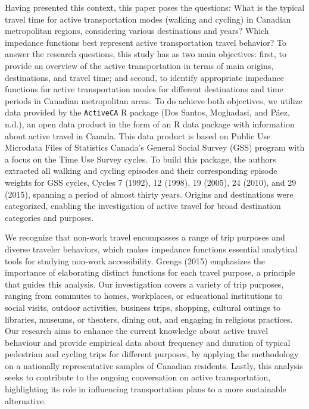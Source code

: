 \documentclass[preprint, 3p,
authoryear]{elsarticle} %
\begin{document}
Having presented this context, this paper poses the questions: What is
the typical travel time for active transportation modes (walking and
cycling) in Canadian metropolitan regions, considering various
destinations and years? Which impedance functions best represent active
transportation travel behavior? To answer the research questions, this
study has as two main objectives: first, to provide an overview of the
active transportation in terms of main origins, destinations, and travel
time; and second, to identify appropriate impedance functions for active
transportation modes for different destinations and time periods in
Canadian metropolitan areas. To do achieve both objectives, we utilize
data provided by the \texttt{ActiveCA} R package (Dos Santos, Moghadasi,
and Páez, n.d.), an open data product in the form of an R data package
with information about active travel in Canada. This data product is
based on Public Use Microdata Files of Statistics Canada's General
Social Survey (GSS) program with a focus on the Time Use Survey cycles.
To build this package, the authors extracted all walking and cycling
episodes and their corresponding episode weights for GSS cycles, Cycles
7 (1992), 12 (1998), 19 (2005), 24 (2010), and 29 (2015), spanning a
period of almost thirty years. Origins and destinations were
categorized, enabling the investigation of active travel for broad
destination categories and purposes.

We recognize that non-work travel encompasses a range of trip purposes
and diverse traveler behaviors, which makes impedance functions
essential analytical tools for studying non-work accessibility. Grengs
(2015) emphasizes the importance of elaborating distinct functions for
each travel purpose, a principle that guides this analysis. Our
investigation covers a variety of trip purposes, ranging from commutes
to homes, workplaces, or educational institutions to social visits,
outdoor activities, business trips, shopping, cultural outings to
libraries, museums, or theaters, dining out, and engaging in religious
practices. Our research aims to enhance the current knowledge about
active travel behaviour and provide empirical data about frequency and
duration of typical pedestrian and cycling trips for different purposes,
by applying the methodology on a nationally representative samples of
Canadian residents. Lastly, this analysis seeks to contribute to the
ongoing conversation on active transportation, highlighting its role in
influencing transportation plans to a more sustainable alternative.
\end{document}

